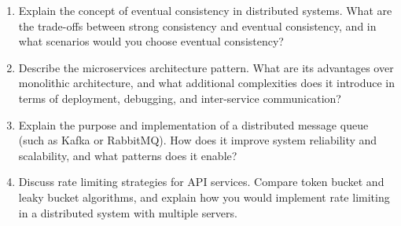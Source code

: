 \documentclass[11pt]{article}
\begin{document}
\begin{enumerate}[label=\textbf{\arabic*.}]
  \item Explain the concept of eventual consistency in distributed systems. What are the trade-offs 
  between strong consistency and eventual consistency, and in what scenarios would you choose 
  eventual consistency?

  \item Describe the microservices architecture pattern. What are its advantages over monolithic 
  architecture, and what additional complexities does it introduce in terms of deployment, debugging, 
  and inter-service communication?

  \item Explain the purpose and implementation of a distributed message queue (such as Kafka or 
  RabbitMQ). How does it improve system reliability and scalability, and what patterns does it enable?

  \item Discuss rate limiting strategies for API services. Compare token bucket and leaky bucket 
  algorithms, and explain how you would implement rate limiting in a distributed system with 
  multiple servers.

\end{enumerate}
\end{document}
